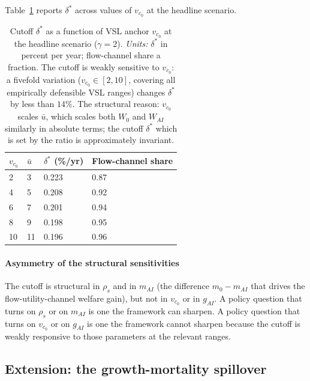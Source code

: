 \documentclass{_latex/house}
\begin{document}
Table~\ref{tab:vsl} reports $\delta^*$ across values of $v_{c_0}$ at the headline scenario.

\begin{table}[!ht]
\centering
\begin{tabular}{ll|ll}
\toprule
$v_{c_0}$ & $\bar u$ & $\delta^*$ (\%/yr) & Flow-channel share \\
\midrule
2  & 3   & 0.223 & 0.87 \\
4  & 5   & 0.208 & 0.92 \\
6  & 7   & 0.201 & 0.94 \\
8  & 9   & 0.198 & 0.95 \\
10 & 11  & 0.196 & 0.96 \\
\bottomrule
\end{tabular}
\caption{Cutoff $\delta^*$ as a function of VSL anchor $v_{c_0}$ at the headline scenario ($\gamma=2$). \emph{Units:} $\delta^*$ in percent per year; flow-channel share a fraction. The cutoff is weakly sensitive to $v_{c_0}$: a fivefold variation ($v_{c_0} \in [2, 10]$, covering all empirically defensible VSL ranges) changes $\delta^*$ by less than $14\%$. The structural reason: $v_{c_0}$ scales $\bar u$, which scales both $W_0$ and $W_{AI}$ similarly in absolute terms; the cutoff $\delta^*$ which is set by the ratio is approximately invariant.}
\label{tab:vsl}
\end{table}

\paragraph{Asymmetry of the structural sensitivities} The cutoff is structural in $\rho_s$ and in $m_{AI}$ (the difference $m_0 - m_{AI}$ that drives the flow-utility-channel welfare gain), but not in $v_{c_0}$ or in $g_{AI}$. A policy question that turns on $\rho_s$ or on $m_{AI}$ is one the framework can sharpen. A policy question that turns on $v_{c_0}$ or on $g_{AI}$ is one the framework cannot sharpen because the cutoff is weakly responsive to those parameters at the relevant ranges.

\subsection{Extension: the growth-mortality spillover}
\label{sec:spillover}
\end{document}
